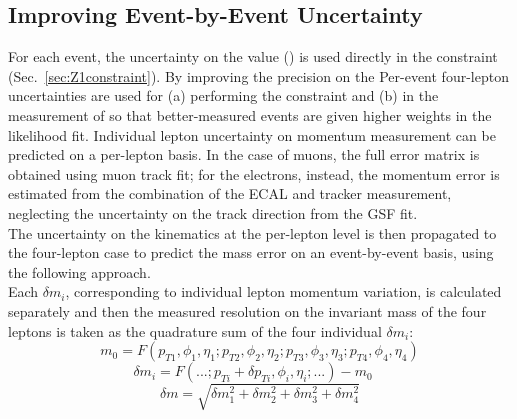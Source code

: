 \subsection{Improving Event-by-Event \mfourl Uncertainty}
\label{sec:ebe}
For each event, the uncertainty on the \mfourl value (\mfourlerr) is used directly in the \Zone constraint (Sec.~\ref{sec:Z1constraint}).
By improving the precision on the \mfourlerr 
Per-event four-lepton uncertainties are used for (a) performing the \Zone constraint and (b) in the measurement of \mH so that better-measured events are given higher weights in the likelihood fit.
Individual lepton uncertainty on momentum measurement can be predicted on a per-lepton 
basis. In the case of muons, the full error matrix is obtained using muon track fit; for the electrons,
instead, the momentum error is estimated from the combination of the ECAL and tracker measurement, 
neglecting the uncertainty on the track direction from the GSF fit. \\
The uncertainty on the kinematics at the per-lepton level is then propagated to the four-lepton case 
to predict the mass error on an event-by-event basis, using the following approach.\\
Each $\delta m_{i}$, corresponding to individual lepton momentum variation, is calculated separately 
and then the measured resolution on the invariant mass of the four leptons is taken as the quadrature sum 
of the four individual $\delta m_{i}$:
\[
m_{0} = F(p_{T1}, \phi_{1},\eta_{1}; p_{T2}, \phi_{2},\eta_{2}; p_{T3}, \phi_{3}, \eta_{3}; p_{T4}, \phi_{4},\eta_{4})
\]
\[\delta m_{i} = F(...; p_{Ti} + \delta p_{Ti}, \phi_{i}, \eta_{i}; ...) - m_{0} \quad
\]
\[
\delta m = \sqrt{\delta m_{1}^2 + \delta m_{2}^2 + \delta m_{3}^2 + \delta m_{4}^2}
\]

